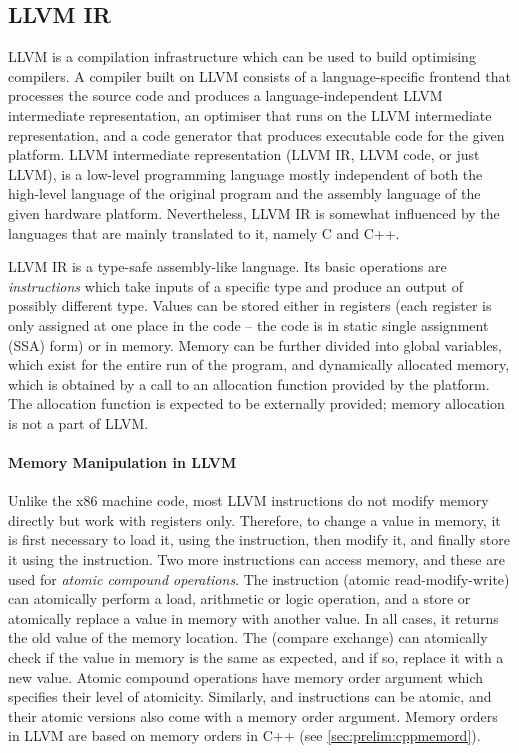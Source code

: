 \subsection{LLVM IR} %

LLVM is a compilation infrastructure which can be used to build optimising
compilers.
A compiler built on LLVM consists of a language-specific frontend that
processes the source code and produces a language-independent LLVM intermediate
representation, an optimiser that runs on the LLVM intermediate
representation, and a code generator that produces executable code for the
given platform.
LLVM intermediate representation (LLVM IR, LLVM code, or just LLVM), is a
low-level programming language mostly independent of both the high-level
language of the original program and the assembly language of the given
hardware platform.
Nevertheless, LLVM IR is somewhat influenced by the languages that are mainly
translated to it, namely C and C++.

LLVM IR is a type-safe assembly-like language.
Its basic operations are \emph{instructions} which take inputs of a specific type
and produce an output of possibly different type.
Values can be stored either in registers (each register is only assigned at one
place in the code -- the code is in static single assignment (SSA) form) or in memory.
Memory can be further divided into global variables, which exist for the entire
run of the program, and dynamically allocated memory, which is obtained by a
call to an allocation function provided by the platform.
The allocation function is expected to be externally provided; memory allocation is not a part of LLVM.

\paragraph{Memory Manipulation in LLVM}

Unlike the x86 machine code, most LLVM instructions do not modify
memory directly but work with registers only.
Therefore, to change a value in memory, it is first necessary to load it, using
the  instruction, then modify it, and finally store it using the
 instruction.
Two more instructions can access memory, and these are used for
\emph{atomic compound operations}.
The  instruction (atomic read-modify-write) can atomically
perform a load, arithmetic or logic operation, and a store or atomically
replace a value in memory with another value.
In all cases, it returns the old value of the memory location.
The  (compare exchange) can atomically check if the value in memory
is the same as expected, and if so, replace it with a new value.
Atomic compound operations have memory order argument which specifies their
level of atomicity.
Similarly,  and  instructions can be atomic, and their atomic
versions also come with a memory order argument.
Memory orders in LLVM are based on memory orders in C++ (see
\autoref{sec:prelim:cppmemord}).

